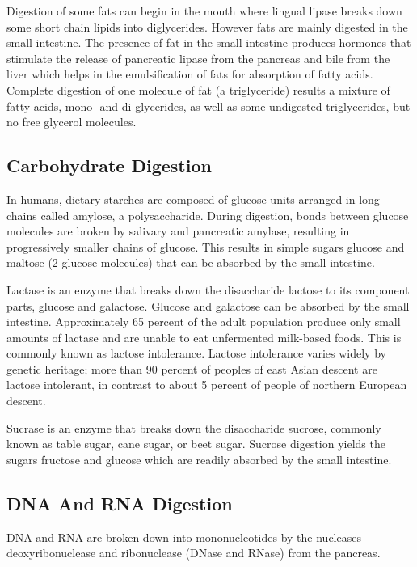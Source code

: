 Digestion of some fats can begin in the mouth where lingual lipase breaks down some short chain lipids into diglycerides. However fats are mainly digested in the small intestine. The presence of fat in the small intestine produces hormones that stimulate the release of pancreatic lipase from the pancreas and bile from the liver which helps in the emulsification of fats for absorption of fatty acids. Complete digestion of one molecule of fat (a triglyceride) results a mixture of fatty acids, mono- and di-glycerides, as well as some undigested triglycerides, but no free glycerol molecules.

\hypertarget{carbohydrate-digestion}{%
\subsection{Carbohydrate Digestion}\label{carbohydrate-digestion}}

In humans, dietary starches are composed of glucose units arranged in long chains called amylose, a polysaccharide. During digestion, bonds between glucose molecules are broken by salivary and pancreatic amylase, resulting in progressively smaller chains of glucose. This results in simple sugars glucose and maltose (2 glucose molecules) that can be absorbed by the small intestine.

Lactase is an enzyme that breaks down the disaccharide lactose to its component parts, glucose and galactose. Glucose and galactose can be absorbed by the small intestine. Approximately 65 percent of the adult population produce only small amounts of lactase and are unable to eat unfermented milk-based foods. This is commonly known as lactose intolerance. Lactose intolerance varies widely by genetic heritage; more than 90 percent of peoples of east Asian descent are lactose intolerant, in contrast to about 5 percent of people of northern European descent.

Sucrase is an enzyme that breaks down the disaccharide sucrose, commonly known as table sugar, cane sugar, or beet sugar. Sucrose digestion yields the sugars fructose and glucose which are readily absorbed by the small intestine.

\hypertarget{dna-and-rna-digestion}{%
\subsection{DNA And RNA Digestion}\label{dna-and-rna-digestion}}

DNA and RNA are broken down into mononucleotides by the nucleases deoxyribonuclease and ribonuclease (DNase and RNase) from the pancreas.


